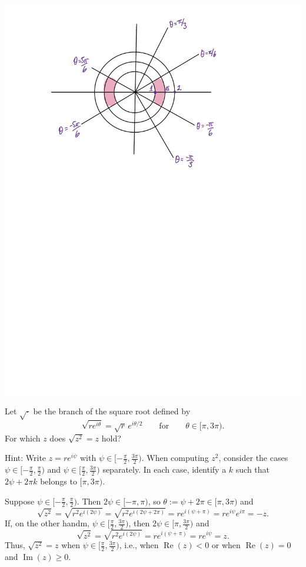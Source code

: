 \documentclass[12pt, answers]{exam}
\renewcommand{\Re}{\operatorname{Re}}
\renewcommand{\Im}{\operatorname{Im}}
\begin{document}
\begin{questions}
\begin{parts}
\begin{solution}
            \includegraphics[scale=0.7]{c.pdf}
        \end{solution}
    \end{parts}
        
        
        
    \question[5]
    Let $\sqrt\cdot$ be the branch of the square root defined by
    \[
        \sqrt{re^{i\theta}} = \sqrt r\,e^{i\theta/2}\qquad\text{for}\qquad \theta\in [\pi, 3\pi).
    \]
    For which $z$ does $\sqrt{z^2}=z$ hold?
    
    Hint: Write $z=re^{i\psi}$ with $\psi\in[-\frac\pi2,\frac{3\pi}2)$. When computing $z^2$, consider the cases $\psi\in[-\frac\pi2,\frac\pi2)$ and $\psi\in[\frac\pi2,\frac{3\pi}2)$ separately.
    In each case, identify a $k$ such that $2\psi + 2\pi k$ belongs to $[\pi, 3\pi)$.

    \begin{solution}
        Suppose $\psi\in[-\frac\pi2,\frac\pi2)$.
        Then $2\psi\in[-\pi, \pi)$, so $\theta := \psi + 2\pi\in [\pi, 3\pi)$ and
        \[
            \sqrt{z^2} = \sqrt{r^2e^{i(2\psi)}} = \sqrt{r^2e^{i(2\psi+2\pi)}}=re^{i(\psi + \pi)}=re^{i\psi}e^{i\pi}=-z.
        \]
        If, on the other handm, $\psi\in[\frac\pi2,\frac{3\pi}2)$, then $2\psi\in [\pi, \frac{3\pi}2)$ and
        \[
            \sqrt{z^2} = \sqrt{r^2e^{i(2\psi)}} =re^{i(\psi + \pi)}=re^{i\psi}=z.
        \]
        Thus, $\sqrt{z^2}=z$ when $\psi\in [\frac\pi2,\frac{3\pi}2)$, i.e., when $\Re(z)<0$ or when $\Re(z)=0$ and $\Im(z)\geq 0$.
    \end{solution}
\end{questions}
\end{document}
